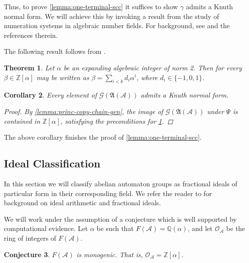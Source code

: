 \documentclass[12pt, letterpaper]{article}
\newcommand{\Z}{\mathbb Z}
\newcommand{\Q}{\mathbb Q}
\newcommand{\A}{\mathcal A}
\newcommand{\princ}{\mathfrak A}
\newcommand{\gp}{\mathcal G}
\newtheorem{thm}{Theorem}[section]
\newtheorem{cor}[thm]{Corollary}
\newtheorem{conj}[thm]{Conjecture}
\begin{document}
Thus, to prove \cref{lemma:one-terminal-scc} it suffices to show $\gamma$
admits a Knuth normal form. We will achieve this by invoking a result from the
study of numeration systems in algebraic number fields. For background,
see \cite{Pethoe09:radix_representations} and the references therein.

The following result follows from \cite{LagariasWang96:tiles,
    LagariasWang97:integral_tiles}.
\begin{thm}\label{thm:lagarias_wang}
    Let $\alpha$ be an expanding algebraic integer of norm 2. Then for every
    $\beta \in \Z[\alpha]$ may be written as
    $\beta = \sum_{i < k} d_i \alpha^i$, where $d_i \in \{-1, 0, 1\}$.
\end{thm}

\begin{cor}\label{cor:principal-tame}
    Every element of $\gp(\princ(\A))$ admits a Knuth normal form.
    \begin{proof}
        By \cref{lemma:princ-copy-chain-gen}, the image of $\gp(\princ(\A))$
        under $\Psi$ is contained in $\Z[\alpha]$, satisfying the preconditions
        for \cref{thm:lagarias_wang}.
    \end{proof}
\end{cor}

The above corollary finishes the proof of \cref{lemma:one-terminal-scc}.

\subsection{Ideal Classification}\label{sec:ideal-rep-classification}
In this section we will classify abelian automaton groups as fractional ideals
of particular form in their corresponding field. We refer the reader to
\cite{stein2012algebraic} for background on ideal arithmetic and fractional
ideals.

We will work under the assumption of a conjecture which is well supported by
computational evidence.  Let $\alpha$ be such that $F(\A) = \Q(\alpha)$, and
let $\mathcal{O}_\A$ be the ring of integers of $F(\A)$.
\begin{conj}\label{conj:power_basis}
    $F(\A)$ is monogenic. That is, $\mathcal{O}_\A = \Z[\alpha]$.
\end{conj}
\end{document}
